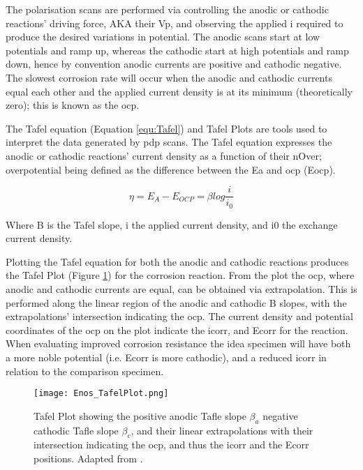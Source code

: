 \documentclass[a4paper,12pt,oneside]{report}%
\begin{document}
The polarisation scans are performed via controlling the anodic or cathodic reactions' driving force, AKA their \gls{Vp}, and observing the applied \gls{i} required to produce the desired variations in potential. The anodic scans start at low potentials and ramp up, whereas the cathodic start at high potentials and ramp down, hence by convention anodic currents are positive and cathodic negative.  The slowest corrosion rate will occur when the anodic and cathodic currents equal each other and the applied current density is at its minimum (theoretically zero); this is known as the \gls{ocp}. 

The Tafel equation (Equation \ref{equ:Tafel}) and Tafel Plots are tools used to interpret the data generated by \gls{pdp} scans. The Tafel equation expresses the anodic or cathodic reactions' current density as a function of their \gls{nOver}; overpotential being defined as the difference between the \gls{Ea} and \gls{ocp} (\acrshort{Eocp}).

\begin{equation}
\eta = E_{A} - E_{OCP}=\beta log \frac{i}{i_{0}}
\label{equ:Tafel}
\end{equation}

Where \acrshort{B} is the Tafel slope, \acrshort{i} the applied current density, and \acrshort{i0} the exchange current density. 

Plotting the Tafel equation for both the anodic and cathodic reactions produces the Tafel Plot (Figure \ref{fig:EnosTafel}) for the corrosion reaction. From the plot the \gls{ocp}, where anodic and cathodic currents are equal, can be obtained via extrapolation. This is performed along the linear region of the anodic and cathodic \acrshort{B} slopes, with the extrapolations' intersection indicating the \gls{ocp}. The current density and potential coordinates of the \gls{ocp} on the plot indicate the \gls{icorr}, and \gls{Ecorr} for the reaction. When evaluating improved corrosion resistance the idea specimen will have both a more noble potential (i.e. \gls{Ecorr} is more cathodic),  and a reduced \gls{icorr} in relation to the comparison specimen.

\begin{figure}[htb]
	\centering
	\texttt{[image: Enos\_TafelPlot.png]}
	\caption[Tafel Plot showing the positive anodic Tafle slope $\beta_{a}$ negative cathodic Tafle slope $\beta_{c}$, and their linear extrapolations with their intersection indicating the \acrshort{ocp}, and thus the \acrshort{icorr} and the \acrshort{Ecorr} positions.]{Tafel Plot showing the positive anodic Tafle slope $\beta_{a}$ negative cathodic Tafle slope $\beta_{c}$, and their linear extrapolations with their intersection indicating the \acrshort{ocp}, and thus the \acrshort{icorr} and the \acrshort{Ecorr} positions. Adapted from \cite{Enos1997}.}
	\label{fig:EnosTafel}
\end{figure}
\end{document}
